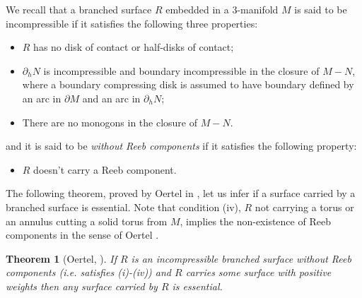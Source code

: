 \documentclass[reqno]{amsart}
\newtheorem{thm}{Theorem}
\theoremstyle{definition}
\theoremstyle{remark}
\begin{document}
We recall that a branched surface $R$ embedded in a 3-manifold $M$ is said to be incompressible if it satisfies the following three properties:

\begin{itemize}
	\item[(i)] $R$ has no disk of contact or half-disks of contact;
	\item[(ii)] $\partial_h N$ is incompressible and  boundary incompressible in the closure of $M-N$, where a boundary compressing disk is assumed to have boundary defined by an arc in $\partial M$ and an arc in $\partial_h N$;
	\item[(iii)] There are no monogons in the closure of $M-N$. 
\end{itemize}

and it is said to be \textit{without Reeb components} if it satisfies the following property: 

\begin{itemize}
\item[(iv)] $R$ doesn't carry a Reeb component.
\end{itemize}


The following theorem, proved by Oertel in \cite{Oertel-84}, let us infer if a surface carried by a branched surface is essential. Note that condition (iv), $R$ not carrying a torus or an annulus cutting a solid torus from $M$, implies the non-existence of Reeb components in the sense of Oertel \cite{Oertel-84}.


\begin{thm}[Oertel, \cite{Oertel-84}]\label{Oertel}
If $R$ is an incompressible branched surface without Reeb components (i.e. satisfies (i)-(iv)) and $R$ carries some surface with positive weights then any surface carried by $R$ is essential.
\end{thm}
\end{document}
